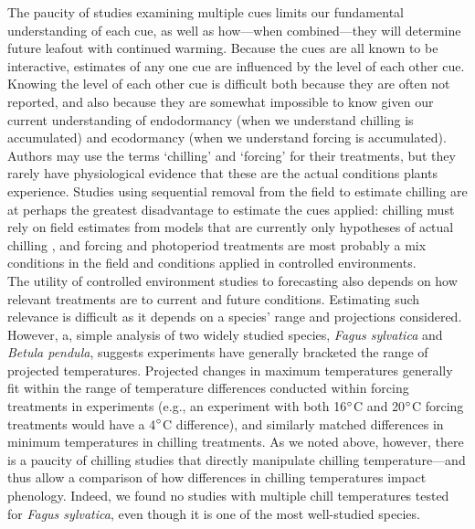 \documentclass[11pt,letter]{article}
\begin{document}
The paucity of studies examining multiple cues limits our fundamental understanding of each cue, as well as how---when combined---they will determine future leafout with continued warming. Because the cues are all known to be interactive, estimates of any one cue are influenced by the level of each other cue. Knowing the level of each other cue is difficult both because they are often not reported, and also because they are somewhat impossible to know given our current understanding of endodormancy (when we understand chilling is accumulated) and ecodormancy (when we understand forcing is accumulated). Authors may use the terms `chilling' and `forcing' for their treatments, but they rarely have physiological evidence that these are the actual conditions plants experience. Studies using sequential removal from the field to estimate chilling are at perhaps the greatest disadvantage to estimate the cues applied: chilling must rely on field estimates from models that are currently only hypotheses of actual chilling \citep{dennis2003}, and forcing and photoperiod treatments are most probably a mix conditions in the field and conditions applied in controlled environments. \\%

The utility of controlled environment studies to forecasting also depends on how relevant treatments are to current and future conditions. Estimating such relevance is difficult as it depends on a species' range and projections considered. However, a, simple analysis of two widely studied species, \emph{Fagus sylvatica} and \emph{Betula pendula}, suggests experiments have generally bracketed the range of projected temperatures. Projected changes in maximum temperatures generally fit within the range of temperature differences conducted within forcing treatments in experiments (e.g., an experiment with both 16$\degree$C  and 20$\degree$C forcing treatments would have a 4$\degree$C difference), and similarly matched differences in minimum temperatures in chilling treatments. As we noted above, however, there is a paucity of chilling studies that directly manipulate chilling temperature---and thus allow a comparison of how differences in chilling temperatures impact phenology. Indeed, we found no studies with multiple chill temperatures tested for \emph{Fagus sylvatica}, even though it is one of the most well-studied species. \\
\end{document}
